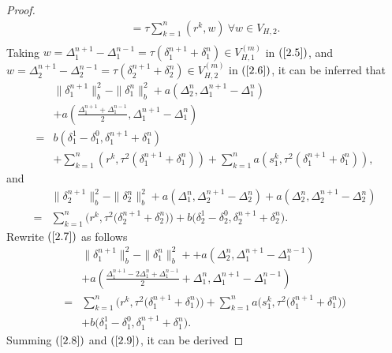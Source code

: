 \documentclass[preprint,12pt]{elsarticle}
\begin{document}
\begin{proof}
\begin{equation}
\begin{aligned}
     =\tau\sum_{k=1}^n(r^k,w)~\forall w\in V_{H,2}.\\
\end{aligned}
\end{equation}
Taking $w=\Delta_1^{n+1}-\Delta_1^{n-1}=\tau(\delta_1^{n+1}+\delta_1^n)\in V_{H,1}^{(m)}$ in $(\ref{2.5})$, and $w=\Delta_2^{n+1}-\Delta_2^{n-1}=\tau(\delta_2^{n+1}+\delta_2^n)\in V_{H,2}^{(m)}$ in $(\ref{2.6})$, it can be inferred that
\begin{equation}\label{2.7}
\begin{aligned}
     &\|\delta_1^{n+1}\|_b^2-\|\delta_1^{n}\|_b^2+a\left(\Delta_2^n,\Delta_1^{n+1}-\Delta_1^n\right)\\
     &+a\left(\frac{\Delta_1^{n+1}+\Delta_1^{n-1}}{2},\Delta_1^{n+1}-\Delta_1^n\right)\\
     =&b(\delta_1^1-\delta_1^0,\delta_1^{n+1}+\delta_1^{n})\\
     &+\sum_{k=1}^n(r^k,\tau^2(\delta_1^{n+1}+\delta_1^{n}))+\sum_{k=1}^na(s_1^k,\tau^2(\delta_1^{n+1}+\delta_1^{n})),
\end{aligned}
\end{equation}
and
\begin{equation}\label{2.8}
\begin{aligned}
     &\|\delta_2^{n+1}\|_b^2-\|\delta_2^{n}\|_b^2+a(\Delta_1^n,\Delta_2^{n+1}-\Delta_2^n)+a\left(\Delta_2^n,\Delta_2^{n+1}-\Delta_2^n\right)\\
     =&\sum_{k=1}^n\Big(r^k,\tau^2\big(\delta_2^{n+1}+\delta_2^{n}\big)\Big)+b\Big(\delta_2^1-\delta_2^0,\delta_2^{n+1}+\delta_2^{n}\Big).
\end{aligned}
\end{equation}
Rewrite $(\ref{2.7})$ as follows
\begin{equation}\label{2.9}
\begin{aligned}
     &\|\delta_1^{n+1}\|_b^2-\|\delta_1^{n}\|_b^2++a\left(\Delta_2^n,\Delta_1^{n+1}-\Delta_1^{n-1}\right)\\
     &+a\left(\frac{\Delta_1^{n+1}-2\Delta_1^{n}+\Delta_1^{n-1}}{2}+\Delta_1^{n},\Delta_1^{n+1}-\Delta_1^{n-1}\right)\\
     =&\sum_{k=1}^n\Big(r^k,\tau^2\big(\delta_1^{n+1}+\delta_1^{n}\big)\Big)+\sum_{k=1}^na\Big(s_1^k,\tau^2\big(\delta_1^{n+1}+\delta_1^{n}\big)\Big)\\
     &+b\Big(\delta_1^1-\delta_1^0,\delta_1^{n+1}+\delta_1^{n}\Big).
\end{aligned}
\end{equation}
Summing $(\ref{2.8})$ and $(\ref{2.9})$, it can be derived

\end{proof}
\end{document}
